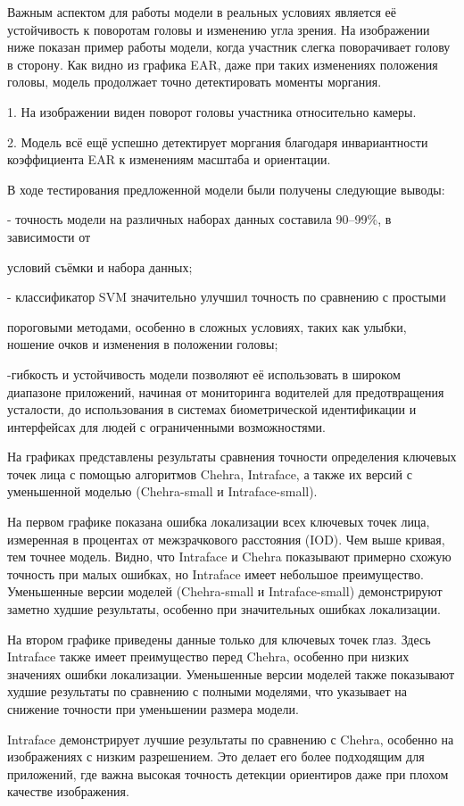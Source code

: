 \begin{multicols}{2}
Важным аспектом для работы модели в реальных условиях является её
устойчивость к поворотам головы и изменению угла зрения. На изображении
ниже показан пример работы модели, когда участник слегка поворачивает
голову в сторону. Как видно из графика EAR, даже при таких изменениях
положения головы, модель продолжает точно детектировать моменты
моргания.

1. На изображении виден поворот головы участника относительно камеры.

2. Модель всё ещё успешно детектирует моргания благодаря инвариантности
коэффициента EAR к изменениям масштаба и ориентации.

В ходе тестирования предложенной модели были получены следующие выводы:

- точность модели на различных наборах данных составила 90--99\%, в
зависимости от

условий съёмки и набора данных;

- классификатор SVM значительно улучшил точность по сравнению с простыми

пороговыми методами, особенно в сложных условиях, таких как улыбки,
ношение очков и изменения в положении головы;

-гибкость и устойчивость модели позволяют её использовать в широком
диапазоне приложений, начиная от мониторинга водителей для
предотвращения усталости, до использования в системах биометрической
идентификации и интерфейсах для людей с ограниченными возможностями.

На графиках представлены результаты сравнения точности определения
ключевых точек лица с помощью алгоритмов Chehra, Intraface, а также их
версий с уменьшенной моделью (Chehra-small и Intraface-small).

На первом графике показана ошибка локализации всех ключевых точек лица,
измеренная в процентах от межзрачкового расстояния (IOD). Чем выше
кривая, тем точнее модель. Видно, что Intraface и Chehra показывают
примерно схожую точность при малых ошибках, но Intraface имеет небольшое
преимущество. Уменьшенные версии моделей (Chehra-small и
Intraface-small) демонстрируют заметно худшие результаты, особенно при
значительных ошибках локализации.

На втором графике приведены данные только для ключевых точек глаз. Здесь
Intraface также имеет преимущество перед Chehra, особенно при низких
значениях ошибки локализации. Уменьшенные версии моделей также
показывают худшие результаты по сравнению с полными моделями, что
указывает на снижение точности при уменьшении размера модели.

Intraface демонстрирует лучшие результаты по сравнению с Chehra,
особенно на изображениях с низким разрешением. Это делает его более
подходящим для приложений, где важна высокая точность детекции
ориентиров даже при плохом качестве изображения.
\end{multicols}

